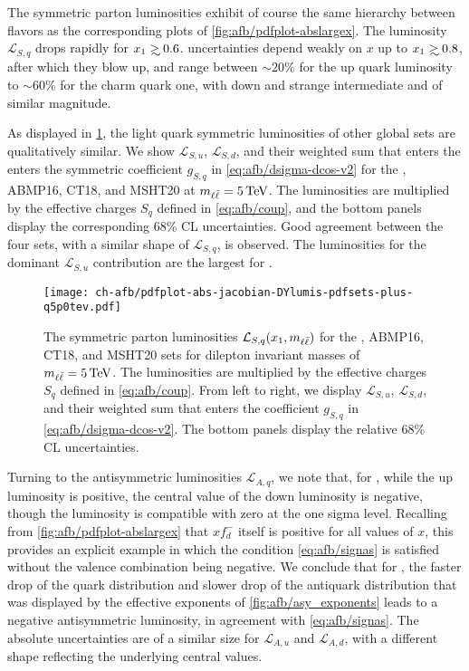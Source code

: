 The symmetric parton luminosities exhibit of course the same hierarchy
between flavors
as the corresponding \pdf plots of \cref{fig:afb/pdfplot-abslargex}. 
%
The luminosity $\mathcal{L}_{S,q}$  drops rapidly for
$x_1\gsim 0.6$. \pdf  uncertainties  depend weakly on  $x$
up to $x_1\gsim 0.8$, after which they blow up, and range between $\sim 20\%$
for the up quark luminosity to $\sim 60\%$ for the charm quark one,
with down and strange intermediate and of similar magnitude.

As displayed in \cref{fig:afb/mll_dep_lumi_plus}, the light quark symmetric luminosities of other global \pdf sets
are qualitatively similar.
%
We show $\mathcal{L}_{S,u}$,  $\mathcal{L}_{S,d}$,
and their weighted sum that enters the  enters the
symmetric coefficient $g_{S,q}$ in \cref{eq:afb/dsigma-dcos-v2}
for the , ABMP16,
CT18, and MSHT20 at $\mll=\SI{5}{\tera\electronvolt}$.
%
The luminosities are multiplied by the effective charges
$S_q$ defined in \cref{eq:afb/coup},
and the bottom panels display the corresponding 68\% CL \pdf uncertainties.
%
Good agreement between the four sets, with a similar shape
of $\mathcal{L}_{S,q}$, is observed.
%
The \pdf luminosities for the dominant $\mathcal{L}_{S,u}$ contribution are the largest for .

\begin{figure}[!t]
 \centering
 \texttt{[image: ch-afb/pdfplot-abs-jacobian-DYlumis-pdfsets-plus-q5p0tev.pdf]}
  \caption{The symmetric 
   parton luminosities $\mathcal{L}_{S,q}(x_1,m_{\ell\bar{\ell}})$ for the , ABMP16,
   CT18, and MSHT20 \nnlo \pdf sets for dilepton
   invariant masses of $\mll=\SI{5}{\tera\electronvolt}$.
   The luminosities are multiplied by the effective charges
   $S_q$ defined in \cref{eq:afb/coup}.
   From left to right, we display $\mathcal{L}_{S,u}$,  $\mathcal{L}_{S,d}$,
   and their weighted sum that enters the  coefficient $g_{S,q}$ in \cref{eq:afb/dsigma-dcos-v2}.
   The bottom panels display the relative 68\% CL \pdf uncertainties.
    }    
 \label{fig:afb/mll_dep_lumi_plus}
\end{figure}

Turning to the antisymmetric \pdf luminosities $\mathcal{L}_{A,q}$,
we note  that, for , while the up luminosity is
positive, the central value of the down luminosity is negative, though
the luminosity is compatible with zero at the one sigma level.
%
Recalling
from \cref{fig:afb/pdfplot-abslargex} that $xf_{d}^-$ itself is
positive for all values of $x$,  this provides an explicit example in
which the condition \cref{eq:afb/signas} is satisfied without the valence
combination being negative.
%
We conclude that for , the faster
drop of the quark distribution and slower drop of the antiquark
distribution that was displayed by the effective exponents of
\cref{fig:afb/asy_exponents} leads to a negative antisymmetric
luminosity, in agreement with \cref{eq:afb/signas}.
The absolute \pdf uncertainties are of a similar size for
$\mathcal{L}_{A,u}$ and $\mathcal{L}_{A,d}$, with a different shape
reflecting the underlying central values.

